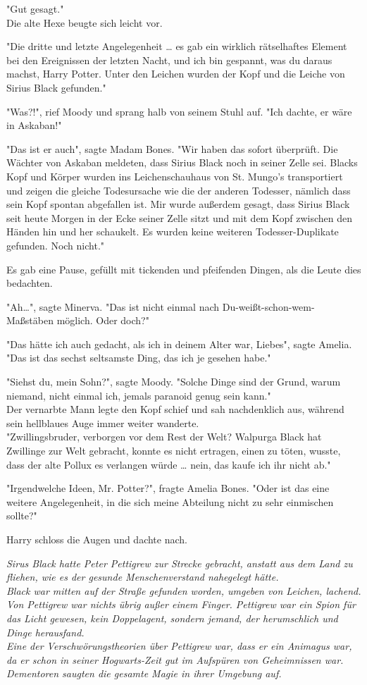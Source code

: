 {"Gut gesagt."\\ Die alte Hexe beugte sich leicht vor.

"Die dritte und letzte Angelegenheit … es gab ein wirklich rätselhaftes Element bei den Ereignissen der letzten Nacht, und ich bin gespannt, was du daraus machst, Harry Potter. Unter den Leichen wurden der Kopf und die Leiche von Sirius Black gefunden."

"Was?!", rief Moody und sprang halb von seinem Stuhl auf. "Ich dachte, er wäre in Askaban!"

"Das ist er auch", sagte Madam Bones. "Wir haben das sofort überprüft. Die Wächter von Askaban meldeten, dass Sirius Black noch in seiner Zelle sei. Blacks Kopf und Körper wurden ins Leichenschauhaus von St. Mungo's transportiert und zeigen die gleiche Todesursache wie die der anderen Todesser, nämlich dass sein Kopf spontan abgefallen ist. Mir wurde außerdem gesagt, dass Sirius Black seit heute Morgen in der Ecke seiner Zelle sitzt und mit dem Kopf zwischen den Händen hin und her schaukelt. Es wurden keine weiteren Todesser-Duplikate gefunden. Noch nicht."

Es gab eine Pause, gefüllt mit tickenden und pfeifenden Dingen, als die Leute dies bedachten.

"Ah…", sagte Minerva. "Das ist nicht einmal nach Du-weißt-schon-wem-Maßstäben möglich. Oder doch?"

"Das hätte ich auch gedacht, als ich in deinem Alter war, Liebes", sagte Amelia. "Das ist das sechst seltsamste Ding, das ich je gesehen habe."

"Siehst du, mein Sohn?", sagte Moody. "Solche Dinge sind der Grund, warum niemand, nicht einmal ich, jemals paranoid genug sein kann."\\ Der vernarbte Mann legte den Kopf schief und sah nachdenklich aus, während sein hellblaues Auge immer weiter wanderte.\\ "Zwillingsbruder, verborgen vor dem Rest der Welt? Walpurga Black hat Zwillinge zur Welt gebracht, konnte es nicht ertragen, einen zu töten, wusste, dass der alte Pollux es verlangen würde … nein, das kaufe ich ihr nicht ab."

"Irgendwelche Ideen, Mr. Potter?", fragte Amelia Bones. "Oder ist das eine weitere Angelegenheit, in die sich meine Abteilung nicht zu sehr einmischen sollte?"

Harry schloss die Augen und dachte nach.

\emph{Sirus Black hatte Peter Pettigrew zur Strecke gebracht, anstatt aus dem Land zu fliehen, wie es der gesunde Menschenverstand nahegelegt hätte.\\ Black war mitten auf der Straße gefunden worden, umgeben von Leichen, lachend. Von Pettigrew war nichts übrig außer einem Finger. Pettigrew war ein Spion für das Licht gewesen, kein Doppelagent, sondern jemand, der herumschlich und Dinge herausfand.}\\ \emph{\hfill\break Eine der Verschwörungstheorien über Pettigrew war, dass er ein Animagus war, da er schon in seiner Hogwarts-Zeit gut im Aufspüren von Geheimnissen war.}\\ \emph{\hfill\break Dementoren saugten die gesamte Magie in ihrer Umgebung auf.}

}

